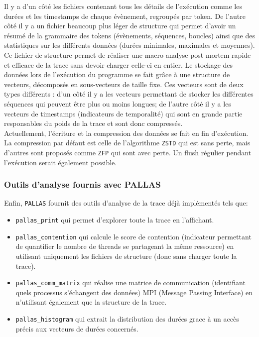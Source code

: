 Il y a d'un côté les fichiers contenant tous les détails de l'exécution comme les durées et les timestamps de chaque évènement, regroupés par token. \newline
De l'autre côté il y a un fichier beaucoup plus léger de structure qui permet d'avoir un résumé de la grammaire des tokens (évènements, séquences, boucles) ainsi que des statistiques
sur les différents données (durées minimales, maximales et moyennes). Ce fichier de structure permet de réaliser une macro-analyse post-mortem rapide et efficace de la trace sans devoir charger celle-ci en entier.\newline
Le stockage des données lors de l'exécution du programme se fait grâce à une structure de vecteurs, décomposés en sous-vecteurs de taille fixe. 
Ces vecteurs sont de deux types différents : d'un côté il y a les vecteurs permettant de stocker les différentes séquences qui peuvent être plus ou moins longues; de l'autre côté
il y a les vecteurs de timestamps (indicateurs de temporalité) qui sont en grande partie responsables du poids de la trace et sont donc compressés.\\
Actuellement, l'écriture et la compression des données se fait en fin d'exécution. La compression par défaut est celle de l'algorithme \verb!ZSTD! qui est sans perte, mais d'autres sont 
proposés comme \verb!ZFP! qui sont avec perte. Un flush régulier pendant l'exécution serait également possible.

\subsubsection{Outils d'analyse fournis avec PALLAS}\label{ssec:analysis_tools}

Enfin, \verb!PALLAS! fournit des outils d'analyse de la trace déjà implémentés tels que: 
\begin{itemize}
    \item \verb!pallas_print! qui permet d'explorer toute la trace en l'affichant.
    \item \verb!pallas_contention! qui calcule le score de contention (indicateur permettant de quantifier le nombre de threads se partageant la même ressource) en utilisant uniquement les fichiers de structure (donc sans charger toute la trace).
    \item \verb!pallas_comm_matrix! qui réalise une matrice de communication (identifiant quels processus s'échangent des données) MPI (Message Passing Interface) en n'utilisant également que la structure de la trace.
    \item \verb!pallas_histogram! qui extrait la distribution des durées grace à un accès précis aux vecteurs de durées concernés.
\end{itemize}

